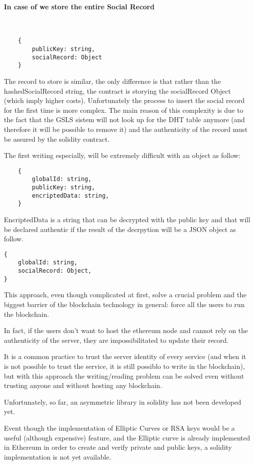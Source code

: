 \paragraph{In case of we store the entire Social Record}\
\begin{lstlisting}
	{
		publicKey: string,
		socialRecord: Object
	}
\end{lstlisting}

The record to store is similar, the only difference is that rather than the hashedSocialRecord string, the contract is storying the socialRecord Object (which imply higher costs).
Unfortunately the process to insert the social record for the first time is more complex.
The main reason of this complexity is due to the fact that the GSLS sistem will not look up for the DHT table anymore (and therefore it will be possible to remove it) and the authenticity of the record must be assured by the solidity contract.

The first writing especially, will be extremely difficult with an object as follow:
\begin{lstlisting}
	{
		globalId: string,
		publicKey: string,
		encriptedData: string,
	}
\end{lstlisting}

EncriptedData is a string that can be decrypted with the public key and that will be declared authentic if the result of the decrpytion will be a JSON object as follow.
\begin{lstlisting}
{
	globalId: string,
	socialRecord: Object,
}
\end{lstlisting}

This approach, even though complicated at first, solve a crucial problem and the biggest barrier of the blockchain technology in general: force all the users to run the blockchain.

In fact, if the users don't want to host the ethereum node and cannot rely on the authenticity of the server, they are impossibilitated to update their record.

It is a common practice to trust the server identity of every service (and when it is not possible to trust the service, it is still possiblo to write in the blockchain), but with this approach the writing/reading problem can be solved even without trusting anyone and without hosting any blockchain.

Unfortunately, so far, an asymmetric library in solidity has not been developed yet.


Event though the implementation of Elliptic Curves or RSA keys would be a useful (although expensive) feature, and the Elliptic curve is already implemented in Ethereum in order to create and verify private and public keys, a solidity implementation is not yet available.


